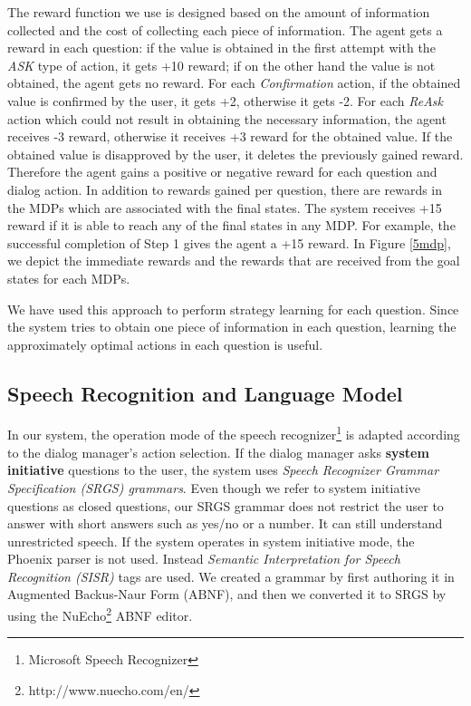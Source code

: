 \begin{sloppy}
The reward function we use is designed based on the amount of information collected and the cost of collecting each piece of information. The agent gets a reward in each question: if the value is obtained in the first attempt with the \textit{ASK} type of action, it gets +10 reward; if on the other hand the value is not obtained, the agent gets no reward. For each \textit{Confirmation} action, if the obtained value is confirmed by the user, it gets +2, otherwise it gets -2. For each \textit{ReAsk} action which could not result in obtaining the necessary information, the agent receives -3 reward, otherwise it receives +3 reward for the obtained value. If the obtained value is disapproved by the user, it deletes the previously gained reward. Therefore the agent gains a positive or negative reward for each question and dialog action. In addition to rewards gained per question, there are rewards in the MDPs which are associated with the final states. The system receives +15 reward if it is able to reach any of the final states in any MDP. For example, the successful completion of Step 1 gives the agent a +15 reward. In Figure \ref{5mdp}, we depict the immediate rewards and the rewards that are received from the goal states for each MDPs.

We have used this approach to perform strategy learning for each question. Since the system tries to obtain one piece of information in each question, learning the approximately optimal actions in each question is useful.

\subsection{Speech Recognition and Language Model}
\label{speechRecognition}

In our system, the operation mode of the speech recognizer\footnote{Microsoft Speech Recognizer} is adapted according to the dialog manager's action selection. If the dialog manager asks {\bf system initiative} questions to the user, the system uses {\em Speech Recognizer Grammar Specification (SRGS) grammars}. Even though we refer to system initiative questions as closed questions, our SRGS grammar does not restrict the user to answer with short answers such as yes/no or a number. It can still understand unrestricted speech. 
If the system operates in system initiative mode, the Phoenix parser is not used. Instead {\em Semantic Interpretation for Speech Recognition (SISR)} tags are used. We created a grammar by first authoring it in Augmented Backus-Naur Form (ABNF), and then we converted it to SRGS by using the NuEcho\footnote{http://www.nuecho.com/en/} ABNF editor. 


\end{sloppy}
